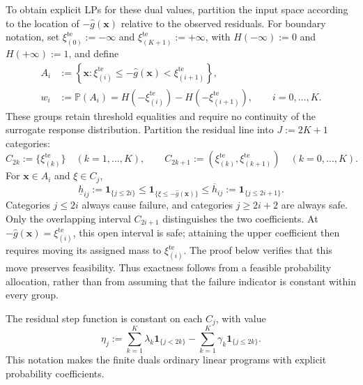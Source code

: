\documentclass[review,11pt,3p,authoryear,nopreprintline]{elsarticle}
\begin{document}
To obtain explicit LPs for these dual values, partition the input space according to the location of $-\hat g(\bm x)$ relative to the observed residuals. For boundary notation, set $\xi_{(0)}^{\mathrm{te}}:=-\infty$ and $\xi_{(K+1)}^{\mathrm{te}}:=+\infty$, with $H(-\infty):=0$ and $H(+\infty):=1$, and define
\begin{equation}
  \begin{aligned}
    A_i&:=\left\{\bm x:\xi_{(i)}^{\mathrm{te}}\le-\hat g(\bm x)<\xi_{(i+1)}^{\mathrm{te}}\right\},\\
    w_i&:=\mathbb P(A_i)
    =H\left(-\xi_{(i)}^{\mathrm{te}}\right)-H\left(-\xi_{(i+1)}^{\mathrm{te}}\right),
    \qquad i=0,\ldots,K.
  \end{aligned}
  \label{eq-input-cells}
\end{equation}
These groups retain threshold equalities and require no continuity of the surrogate response distribution. Partition the residual line into $J:=2K+1$ categories:
\begin{equation}
  C_{2k}:=\{\xi_{(k)}^{\mathrm{te}}\}\quad(k=1,\ldots,K),\qquad
  C_{2k+1}:=(\xi_{(k)}^{\mathrm{te}},\xi_{(k+1)}^{\mathrm{te}})\quad(k=0,\ldots,K).
  \label{eq-residual-cells}
\end{equation}
For $\bm x\in A_i$ and $\xi\in C_j$,
\begin{equation}
  \underline h_{ij}:=\mathbf1_{\{j\le2i\}}
  \le\mathbf1_{\{\xi\le -\hat g(\bm x)\}}
  \le\overline h_{ij}:=\mathbf1_{\{j\le2i+1\}}.
  \label{eq-cell-costs}
\end{equation}
Categories $j\le2i$ always cause failure, and categories $j\ge2i+2$ are always safe. Only the overlapping interval $C_{2i+1}$ distinguishes the two coefficients. At $-\hat g(\bm x)=\xi_{(i)}^{\mathrm{te}}$, this open interval is safe; attaining the upper coefficient then requires moving its assigned mass to $\xi_{(i)}^{\mathrm{te}}$. The proof below verifies that this move preserves feasibility. Thus exactness follows from a feasible probability allocation, rather than from assuming that the failure indicator is constant within every group.

The residual step function is constant on each $C_j$, with value
\begin{equation}
  \eta_j:=\sum_{k=1}^K\lambda_k\mathbf1_{\{j<2k\}}
    -\sum_{k=1}^K\gamma_k\mathbf1_{\{j\le2k\}}.
  \label{eq-dual-cell-values}
\end{equation}
This notation makes the finite duals ordinary linear programs with explicit probability coefficients.
\end{document}
